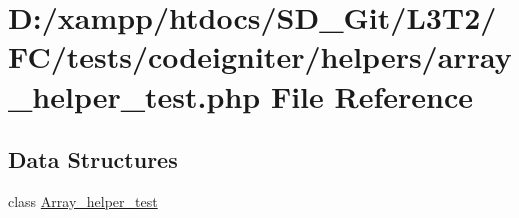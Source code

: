 \hypertarget{array__helper__test_8php}{}\section{D\+:/xampp/htdocs/\+S\+D\+\_\+\+Git/\+L3\+T2/\+F\+C/tests/codeigniter/helpers/array\+\_\+helper\+\_\+test.php File Reference}
\label{array__helper__test_8php}
\subsection*{Data Structures}
\begin{DoxyCompactItemize}
\item 
class \hyperlink{class_array__helper__test}{Array\+\_\+helper\+\_\+test}
\end{DoxyCompactItemize}
